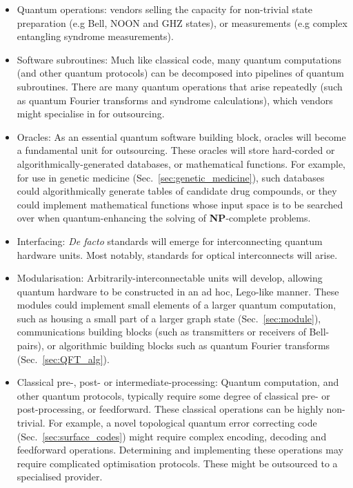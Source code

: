 \begin{itemize}
\item Quantum operations: vendors selling the capacity for non-trivial state preparation (e.g Bell, NOON and GHZ states), or measurements (e.g complex entangling syndrome measurements).

\item Software subroutines: Much like classical code, many quantum computations (and other quantum protocols) can be decomposed into pipelines of quantum subroutines. There are many quantum operations that arise repeatedly (such as quantum Fourier transforms and syndrome calculations), which vendors might specialise in for outsourcing.

\item Oracles: As an essential quantum software building block, oracles will become a fundamental unit for outsourcing. These oracles will store hard-corded or algorithmically-generated databases, or mathematical functions. For example, for use in genetic medicine (Sec.~\ref{sec:genetic_medicine}), such databases could algorithmically generate tables of candidate drug compounds, or they could implement mathematical functions whose input space is to be searched over when quantum-enhancing the solving of \textbf{NP}-complete problems.

\item Interfacing: \textit{De facto} standards will emerge for interconnecting quantum hardware units. Most notably, standards for optical interconnects will arise.

\item Modularisation: Arbitrarily-interconnectable units will develop, allowing quantum hardware to be constructed in an ad hoc, Lego-like manner. These modules could implement small elements of a larger quantum computation, such as housing a small part of a larger graph state (Sec.~\ref{sec:module}), communications building blocks (such as transmitters or receivers of Bell-pairs), or algorithmic building blocks such as quantum Fourier transforms (Sec.~\ref{sec:QFT_alg}).

\item Classical pre-, post- or intermediate-processing: Quantum computation, and other quantum protocols, typically require some degree of classical pre- or post-processing, or feedforward. These classical operations can be highly non-trivial. For example, a novel topological quantum error correcting code (Sec.~\ref{sec:surface_codes}) might require complex encoding, decoding and feedforward operations. Determining and implementing these operations may require complicated optimisation protocols. These might be outsourced to a specialised provider.


\end{itemize}
